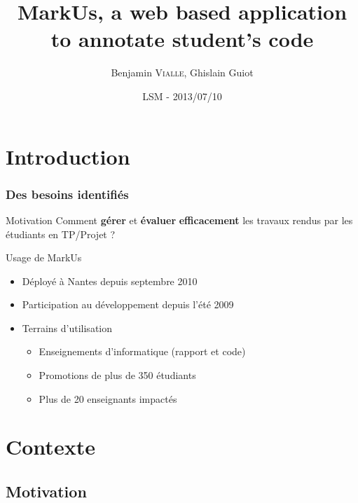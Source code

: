 \documentclass[svgnames,hyperref, english, xcolor=dvipsnames,usenames]{beamer}		        %
\title[MarkUs]%
{MarkUs, a web based application to annotate student's code}
\author[B. \textsc{Vialle}, G. \textsc{Guiot}]%
{Benjamin \textsc{Vialle}, Ghislain Guiot}
\institute[ECN]{\structure{École Centrale de Nantes}}
\date[2013-07-10]{LSM - 2013/07/10}
\begin{document}
\frame{\titlepage}


\section{Introduction}

\frame
{
        \frametitle{Des besoins identifiés}

        \begin{alertblock}{Motivation}
                Comment \textbf{gérer} et \textbf{évaluer} \textbf{efficacement} les travaux rendus par les étudiants en TP/Projet ?
        \end{alertblock}

        \begin{block}{Usage de MarkUs}
                \begin{itemize}
                        \item Déployé à Nantes depuis septembre 2010
                        \item Participation au développement depuis l'été 2009
                        \item Terrains d'utilisation
                                \begin{itemize}
                                        \item Enseignements d'informatique (rapport et code)
                                        \item Promotions de plus de 350 étudiants
                                        \item Plus de 20 enseignants impactés
                                \end{itemize}
                \end{itemize}
        \end{block}
}

\section{Contexte}

\subsection*{Motivation}
\end{document}
